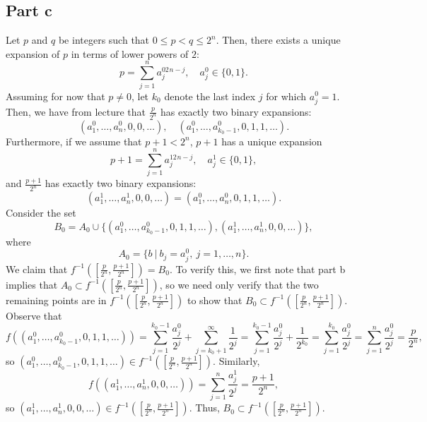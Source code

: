 \documentclass{article}
\begin{document}
\subsection{Part c}
Let $p$ and $q$ be integers such that $0\leq p<q\leq2^n$. Then, there exists a unique expansion of $p$ in terms of lower powers of $2$:
\[
p=\sum_{j=1}^na_j^02^{n-j},\quad a_j^0\in\{0,1\}.
\]
Assuming for now that $p\neq0$, let $k_0$ denote the last index $j$ for which $a_j^0=1$. Then, we have from lecture that $\frac{p}{2^n}$ has exactly two binary expansions:
\[
(a_1^0,\ldots,a_n^0,0,0,\ldots),\quad(a_1^0,\ldots,a_{k_0-1}^0,0,1,1,\ldots).
\]
Furthermore, if we assume that $p+1<2^n$, ${p+1}$ has a unique expansion
\[
p+1=\sum_{j=1}^na_j^12^{n-j},\quad a^1_j\in\{0,1\},
\]
and $\frac{p+1}{2^n}$ has exactly two binary expansions:
\[
(a_1^1,\ldots,a_{ n}^1,0,0,\ldots)=(a_1^0,\ldots,a_{n}^0,0,1,1,\ldots).
\]
Consider the set 
\[
B_0=A_0\cup\{(a_1^0,\ldots,a^0_{k_0-1},0,1,1,\ldots),( a^1_1,\ldots,a^1_n,0,0,\ldots)\},
\]
where 
\[
A_0=\{b~|~b_j=a^0_j,~j=1,\ldots,n\}.
\]
We claim that $f^{-1}\left(\left[\frac{p}{2^n},\frac{p+1}{2^n}\right]\right)=B_0$. To verify this, we first note that part b implies that $A_0\subset f^{-1}\left(\left[\frac{p}{2^n},\frac{p+1}{2^n}\right]\right)$, so we need only verify that the two remaining points are in $f^{-1}\left(\left[\frac{p}{2^n},\frac{p+1}{2^n}\right]\right)$ to show that $B_0\subset f^{-1}\left(\left[\frac{p}{2^n},\frac{p+1}{2^n}\right]\right)$. Observe that 
\[
f\left((a^0_1,\ldots,a^0_{k_0-1},0,1,1,\ldots)\right)=\sum_{j=1}^{k_0-1}\frac{a^0_j}{2^j}+\sum_{j=k_0+1}^\infty\frac{1}{2^j}=\sum_{j=1}^{k_0-1}\frac{a^0_j}{2^j}+\frac{1}{2^{k_0}}=\sum_{j=1}^{k_0}\frac{a^0_j}{2^j}=\sum_{j=1}^{n}\frac{a^0_j}{2^j}=\frac{p}{2^n},
\]
so $(a^0_1,\ldots,a^0_{k_0-1},0,1,1,\ldots)\in f^{-1}\left(\left[\frac{p}{2^n},\frac{p+1}{2^n}\right]\right)$. Similarly, 
\[
f\left(( a^1_1,\ldots,a^1_{n},0,0,\ldots)\right)=\sum_{j=1}^{n}\frac{a^1_j}{2^j}=\frac{p+1}{2^n},
\]
so $(a^1_1,\ldots,a^1_{n},0,0,\ldots)\in f^{-1}\left(\left[\frac{p}{2^n},\frac{p+1}{2^n}\right]\right)$. Thus, $B_0\subset f^{-1}\left(\left[\frac{p}{2^n},\frac{p+1}{2^n}\right]\right)$.
\end{document}
